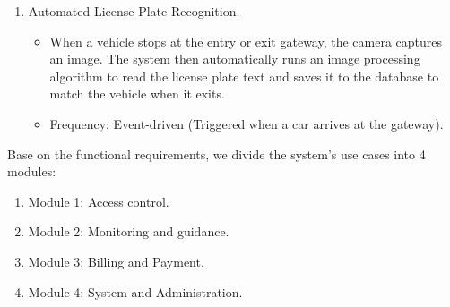 \begin{enumerate}
    \begin{itemize}
        \item The system continuously receives signals from parking sensors. When a vehicle parks or leaves, the system automatically calculates the available spots and updates the signage immediately.
        \item Frequency: Event-driven (Triggered when a sensor's status changes).
    \end{itemize}
    \item Automated License Plate Recognition.
    \begin{itemize}
        \item When a vehicle stops at the entry or exit gateway, the camera captures an image. The system then automatically runs an image processing algorithm to read the license plate text and saves it to the database to match the vehicle when it exits.
        \item Frequency: Event-driven (Triggered when a car arrives at the gateway).
    \end{itemize}
\end{enumerate}

Base on the functional requirements, we divide the system's use cases into 4 modules:
\begin{enumerate}
    \item Module 1: Access control.
    \item Module 2: Monitoring and guidance.
    \item Module 3: Billing and Payment.
    \item Module 4: System and Administration.
\end{enumerate}
